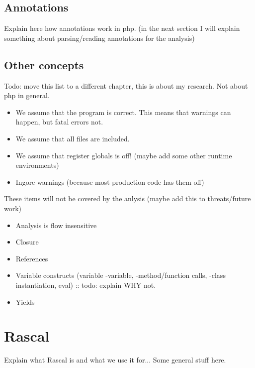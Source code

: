 \documentclass[../main.tex]{subfiles}
\begin{document}
    \subsection{Annotations}
    Explain here how annotations work in php. (in the next section I will explain something about parsing/reading annotations for the analysis)
    
    \subsection{Other concepts}
    Todo: move this list to a different chapter, this is about my research. Not about php in general.
    \begin{itemize}
        \item We assume that the program is correct. This means that warnings can happen, but fatal errors not.
        \item We assume that all files are included.
        \item We assume that register globals is off! (maybe add some other runtime environments)
        \item Ingore warnings (because most production code has them off)
    \end{itemize}
    These items will not be covered by the anlysis (maybe add this to threats/future work)
    \begin{itemize}
        \item Analysis is flow insensitive
        \item Closure
        \item References
        \item Variable constructs (variable -variable, -method/function calls, -class instantiation, eval) :: todo: explain WHY not.
        \item Yields
        
    \end{itemize}


    
    \section{Rascal}
    Explain what \Gls{Rascal} is and what we use it for...
    Some general stuff here.
\end{document}
